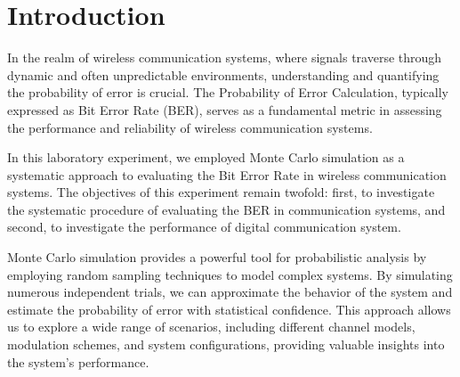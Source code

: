 \documentclass[a4paper, 12pt, english]{article}
\begin{document}


\newpage
\section{Introduction}
In the realm of wireless communication systems, where signals traverse through dynamic and often unpredictable environments, understanding and quantifying the probability of error is crucial. The Probability of Error Calculation, typically expressed as Bit Error Rate (BER), serves as a fundamental metric in assessing the performance and reliability of wireless communication systems.
\newline

In this laboratory experiment, we employed Monte Carlo simulation as a systematic approach to evaluating the Bit Error Rate in wireless communication systems. The objectives of this experiment remain twofold: first, to investigate the systematic procedure of evaluating the BER in communication systems, and second, to investigate the performance of digital communication system.
\newline

Monte Carlo simulation provides a powerful tool for probabilistic analysis by employing random sampling techniques to model complex systems. By simulating numerous independent trials, we can approximate the behavior of the system and estimate the probability of error with statistical confidence. This approach allows us to explore a wide range of scenarios, including different channel models, modulation schemes, and system configurations, providing valuable insights into the system's performance.
\newline


\newpage
\end{document}
